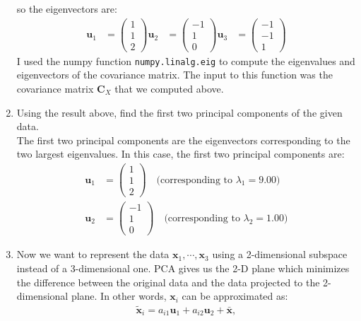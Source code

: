 \documentclass[a3paper,12pt]{extarticle} %
\begin{document}
\begin{enumerate}
so the eigenvectors are:
\begin{align}
    \mathbf{u}_1  &= \begin{pmatrix}
    1\\
    1\\
    2
    \end{pmatrix}
    \mathbf{u}_2  &= \begin{pmatrix}
    -1\\
    1\\
    0
    \end{pmatrix}
    \mathbf{u}_3  &= \begin{pmatrix}
    -1\\
    -1\\
    1
    \end{pmatrix}
\end{align}
I used the numpy function \texttt{numpy.linalg.eig} to compute the eigenvalues and eigenvectors of the covariance matrix. The input to this function was the covariance matrix $\mathbf{C}_X$ that we computed above.   
\item 
Using the result above, find the first two principal components of the given data.
\\ The first two principal components are the eigenvectors corresponding to the two largest eigenvalues. In this case, the first two principal components are:
\begin{align}
\mathbf{u}_1 &= \begin{pmatrix}
1\\
1\\
2
\end{pmatrix} \quad \text{(corresponding to } \lambda_1 = 9.00\text{)}\\
\mathbf{u}_2 &= \begin{pmatrix}
-1\\
1\\
0
\end{pmatrix} \quad \text{(corresponding to } \lambda_2 = 1.00\text{)}
\end{align}

\item
Now we want to represent the data $\mathbf{x}_1, \cdots, \mathbf{x}_3$ using a 2-dimensional subspace instead of a 3-dimensional one. PCA gives us the 2-D plane which minimizes the difference between the original data and the data projected to the 2-dimensional plane. In other words, $\mathbf{x}_i$ can be approximated as:
\begin{align}
\tilde{\mathbf{x}}_i = a_{i1}\mathbf{u}_1 + a_{i2}\mathbf{u}_2 + \bar{\mathbf{x}},
\end{align}


\end{enumerate}
\end{document}
